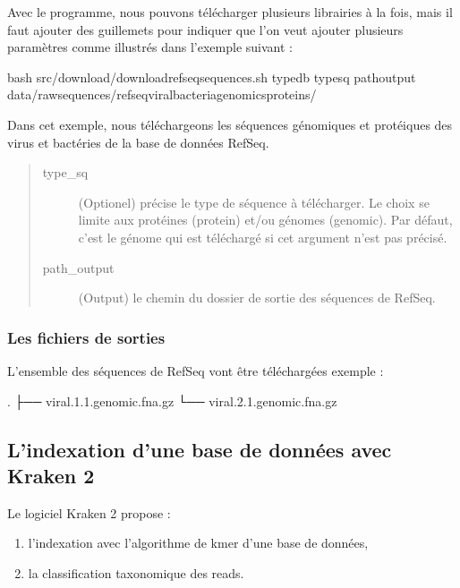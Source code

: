 \documentclass[letterpaper,10pt,french]{sphinxmanual}
\begin{document}
Avec le programme, nous pouvons télécharger plusieurs librairies à la fois, mais il faut ajouter des guillemets pour indiquer que l’on veut ajouter plusieurs paramètres comme illustrés dans l’exemple suivant :

\begin{sphinxVerbatim}[commandchars=\\\{\}]
bash src/download/download\PYGZus{}refseq\PYGZus{}sequences.sh 
        \PYGZhy{}type\PYGZus{}db  
        \PYGZhy{}type\PYGZus{}sq  
        \PYGZhy{}path\PYGZus{}output data/raw\PYGZus{}sequences/refseq\PYGZus{}viral\PYGZus{}bacteria\PYGZus{}genomics\PYGZus{}proteins/
\end{sphinxVerbatim}

Dans cet exemple, nous téléchargeons les séquences génomiques et protéiques des virus et bactéries de la base de données RefSeq.
\begin{quote}\begin{description}
\item[{\sphinxhyphen{}type\_sq}] \leavevmode
(Optionel) précise le type de séquence à télécharger. Le choix se limite aux protéines (protein) et/ou génomes (genomic). Par défaut, c’est le génome qui est téléchargé si cet argument n’est pas précisé.

\item[{\sphinxhyphen{}path\_output}] \leavevmode
(Output) le chemin du dossier de sortie des séquences de RefSeq.

\end{description}\end{quote}


\subsubsection{Les fichiers de sorties}
\label{\detokenize{tutorial:id18}}
L’ensemble des séquences de RefSeq vont être téléchargées exemple :

\begin{sphinxVerbatim}[commandchars=\\\{\}]
.
├── viral.1.1.genomic.fna.gz
└── viral.2.1.genomic.fna.gz
\end{sphinxVerbatim}


\subsection{L’indexation d’une base de données avec Kraken 2}
\label{\detokenize{tutorial:l-indexation-d-une-base-de-donnees-avec-kraken-2}}\label{\detokenize{tutorial:indexation-kraken2}}
Le logiciel Kraken 2 propose :
\begin{enumerate}
%
\item {} 
l’indexation avec l’algorithme de k\sphinxhyphen{}mer d’une base de données,

\item {} 
la classification taxonomique des reads.

\end{enumerate}
\end{document}
